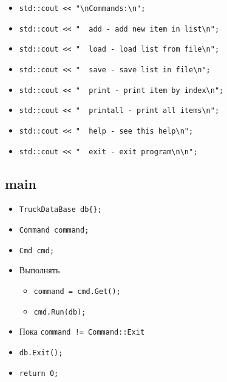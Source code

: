 \begin{itemize}
	\item \verb|std::cout << "\nCommands:\n";|
    \item \verb|std::cout << "  add - add new item in list\n";|
    \item \verb|std::cout << "  load - load list from file\n";|
    \item \verb|std::cout << "  save - save list in file\n";|
    \item \verb|std::cout << "  print - print item by index\n";|
    \item \verb|std::cout << "  printall - print all items\n";|
    \item \verb|std::cout << "  help - see this help\n";|
    \item \verb|std::cout << "  exit - exit program\n\n";|
\end{itemize}


\subsection*{main}

\begin{itemize}
	\item \verb|TruckDataBase db{};|
    \item \verb|Command command;|
    \item \verb|Cmd cmd;|
    \item Выполнять
		\begin{itemize}
			\item \verb|command = cmd.Get();|
			\item \verb|cmd.Run(db);|
		\end{itemize}
    \item Пока \verb|command != Command::Exit|
    \item \verb|db.Exit();|
    \item \verb|return 0;|
\end{itemize}